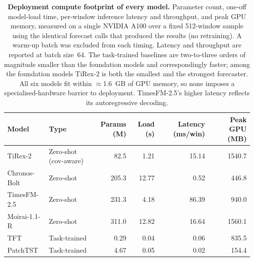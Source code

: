 \begin{table}[ht]
\centering\footnotesize
\caption{\textbf{Deployment compute footprint of every model.} Parameter count,
one-off model-load time, per-window inference latency and throughput, and peak GPU
memory, measured on a single NVIDIA A100 over a fixed 512-window sample using the
identical forecast calls that produced the results (no retraining). A warm-up batch
was excluded from each timing. Latency and throughput are reported at batch size~64.
The task-trained baselines are two-to-three orders of magnitude smaller than the
foundation models and correspondingly faster; among the foundation models TiRex-2 is
both the smallest and the strongest forecaster. All six models fit within
$\approx$1.6~GB of GPU memory, so none imposes a specialised-hardware barrier to
deployment. TimesFM-2.5's higher latency reflects its autoregressive decoding.}
\label{tab:compute_footprint}
\begin{tabular}{llrrrr}
\toprule
Model & Type & Params (M) & Load (s) & Latency (ms/win) & Peak GPU (MB) \\
\midrule
TiRex-2 & Zero-shot (cov-aware) & 82.5 & 1.21 & 15.14 & 1540.7 \\
Chronos-Bolt & Zero-shot & 205.3 & 12.77 & 0.52 & 446.8 \\
TimesFM-2.5 & Zero-shot & 231.3 & 4.18 & 86.39 & 940.0 \\
Moirai-1.1-R & Zero-shot & 311.0 & 12.82 & 16.64 & 1560.1 \\
TFT & Task-trained & 0.29 & 0.04 & 0.06 & 835.5 \\
PatchTST & Task-trained & 4.67 & 0.05 & 0.02 & 154.4 \\
\bottomrule
\end{tabular}
\end{table}

